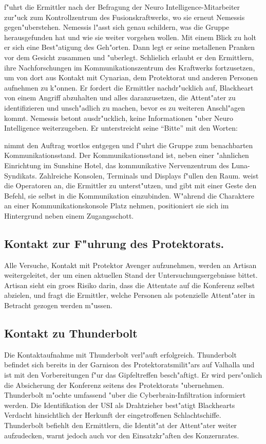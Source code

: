 \xl{} f"uhrt die Ermittler nach der Befragung der Neuro Intelligence-Mitarbeiter zur"uck zum Kontrollzentrum des Fusionskraftwerks, wo sie erneut Nemessis gegen"uberstehen. Nemessis l"asst sich genau schildern, was die Gruppe herausgefunden hat und wie sie weiter vorgehen wollen. Mit einem Blick zu \xl{} holt er sich eine Best"atigung des Geh"orten. Dann legt er seine metallenen Pranken vor dem Gesicht zusammen und "uberlegt. Schlie\3lich erlaubt er den Ermittlern, ihre Nachforschungen im Kommunikationszentrum des Kraftwerks fortzusetzen, um von dort aus Kontakt mit Cynarian, dem Protektorat und anderen Personen aufnehmen zu k"onnen. Er fordert die Ermittler nachdr"ucklich auf, Blackheart von einem Angriff abzuhalten und alles daranzusetzen, die Attent"ater zu identifizieren und unsch"adlich zu machen, bevor es zu weiteren Anschl"agen kommt. Nemessis betont ausdr"ucklich, keine Informationen "uber Neuro Intelligence weiterzugeben. Er unterstreicht seine "`Bitte"' mit den Worten:


\xl{} nimmt den Auftrag wortlos entgegen und f"uhrt die Gruppe zum benachbarten Kommunikationsstand. Der Kommunikationsstand ist, neben einer "ahnlichen Einrichtung im Sunshine Hotel, das kommunikative Nervenzentrum des Luna-Syndikats. Zahlreiche Konsolen, Terminals und Displays f"ullen den Raum. \xl{} weist die Operatoren an, die Ermittler zu unterst"utzen, und gibt mit einer Geste den Befehl, sie selbst in die Kommunikation einzubinden. W"ahrend die Charaktere an einer Kommunikationskonsole Platz nehmen, positioniert sie sich im Hintergrund neben einem Zugangsschott.

\subsection{Kontakt zur F"uhrung des Protektorats.} 
Alle Versuche, Kontakt mit Protektor Avenger aufzunehmen, werden an Artisan weitergeleitet, der um einen aktuellen Stand der Untersuchungsergebnisse bittet. Artisan sieht ein gro\3es Risiko darin, dass die Attentate auf die Konferenz selbst abzielen, und fragt die Ermittler, welche Personen als potenzielle Attent"ater in Betracht gezogen werden m"ussen.

\subsection{Kontakt zu Thunderbolt} 
Die Kontaktaufnahme mit Thunderbolt verl"auft erfolgreich. Thunderbolt befindet sich bereits in der Garnison des Protektoratsmilit"ars auf Valhalla und ist mit den Vorbereitungen f"ur das Gipfeltreffen besch"aftigt. Er wird pers"onlich die Absicherung der Konferenz seitens des Protektorats "ubernehmen. Thunderbolt m"ochte umfassend "uber die Cyberbrain-Infiltration informiert werden. Die Identifikation der USI als Drahtzieher best"atigt Blackhearts Verdacht hinsichtlich der Herkunft der eingetroffenen Schlachtschiffe. Thunderbolt befiehlt den Ermittlern, die Identit"at der Attent"ater weiter aufzudecken, warnt jedoch auch vor den Einsatzkr"aften des Konzernrates. 

